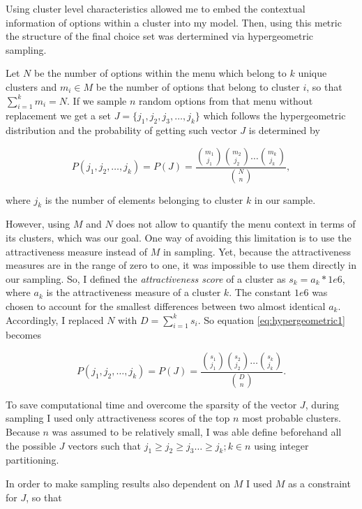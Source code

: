 \documentclass[a4paper,12pt]{article}
\begin{document}
Using cluster level characteristics allowed me to embed the contextual information of options within a cluster into my model. Then, using this metric the structure of the final choice set was dertermined via hypergeometric sampling. 

Let $N$ be the number of options within the menu which belong to $k$ unique clusters and $m_i\in M$ be the number  of options that belong to cluster $i$, so that $\sum_{i=1}^{k}m_i= N$. If we sample $n$ random options from that menu without replacement we get a set $J = \{j_1,j_2,j_3, \dots,j_k\}$ which follows the hypergeometric distribution and the probability of getting such vector $J$ is determined by

\begin{equation}\label{eq:hypergeometric1}
    P(j_1, j_2,\ldots, j_k) = P(J) =\frac{{m_1\choose j_1} {m_2\choose j_2} \dots {m_k\choose j_k}}{{N\choose n}} ,
\end{equation}

where $j_k$ is the number of elements belonging to cluster $k$ in our sample. 
 
However, using $M$ and $N$ does not allow to quantify the menu context in terms of its clusters, which was our goal. One way of avoiding this limitation is to use the attractiveness measure instead of $M$ in sampling. Yet, because the attractiveness measures are in the range of zero to one, it was impossible to use them directly in our sampling. So, I defined the \textit{attractiveness score} of a cluster as $s_k = a_k \ast 1e6$, where $a_k$ is the attractiveness measure of a cluster $k$. The constant $1e6$ was chosen to account for the smallest differences between two almost identical $a_k$. Accordingly, I replaced $N$ with $D=\sum_{i=1}^{k}s_i$. So equation \ref{eq:hypergeometric1} becomes

\begin{equation}\label{eq:hypergeometric2}
    P(j_1, j_2,\ldots, j_k) = P(J) =\frac{{s_1\choose j_1} {s_2\choose j_2} \dots {s_k\choose j_k}}{{D\choose n}}.
\end{equation}

To save computational time and overcome the sparsity of the vector $J$, during sampling I used only attractiveness scores of the top $n$ most probable clusters. Because $n$ was assumed to be relatively small, I was able define beforehand all the possible $J$ vectors such that $j_1\geq j_2\geq j_3\ldots\geq j_k; k \in n$ using integer partitioning.

In order to make sampling results also dependent on $M$ I used $M$ as a constraint for $J$, so that 
\end{document}
